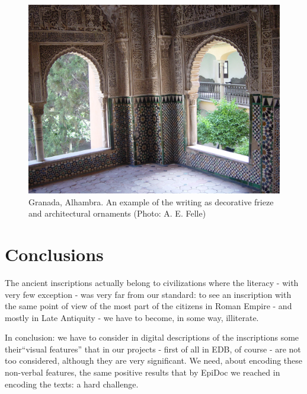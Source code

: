 \documentclass[amsthm,ebook]{saparticle}
\begin{document}
\begin{figure}[!hbp]
\centering
 \includegraphics[width=\columnwidth]{FelleVisualFeaturesofinscriptionsEAGLE2016FullPaper-img014.jpg}
\caption{Granada, Alhambra. An example of the writing as decorative frieze and architectural ornaments (Photo: A. E.
Felle)}
\label{fig:10}
\end{figure}







\section{Conclusions}


\noindent The ancient inscriptions actually belong to civilizations where the literacy - with very few exception - was very far
from our standard: to see an inscription with the same point of view of the most part of the citizens in Roman Empire -
and mostly in Late Antiquity - we have to become, in some way, illiterate. 

In conclusion: we have to consider in digital descriptions of the inscriptions some their``visual
features'' that in our projects - first of all in EDB, of course - are not too considered, although they
are very significant. We need, about encoding these non-verbal features, the same positive results that by EpiDoc we
reached in encoding the texts: a hard challenge.

\nocite{Manzella1997Felle}



\end{document}
